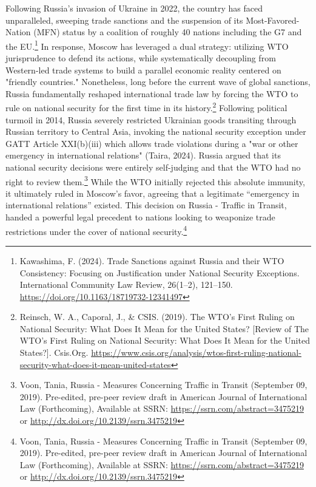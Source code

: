 Following Russia’s invasion of Ukraine in 2022, the country has faced unparalleled, sweeping trade sanctions and the suspension of its Most-Favored-Nation (MFN) status by a coalition of roughly 40 nations including the G7 and the EU.\footnote{Kawashima, F. (2024). Trade Sanctions against Russia and their WTO Consistency: Focusing on Justification under National Security Exceptions. International Community Law Review, 26(1–2), 121–150. \url{https://doi.org/10.1163/18719732-12341497}} In response, Moscow has leveraged a dual strategy: utilizing WTO jurisprudence to defend its actions, while systematically decoupling from Western-led trade systems to build a parallel economic reality centered on "friendly countries." Nonetheless, long before the current wave of global sanctions, Russia fundamentally reshaped international trade law by forcing the WTO to rule on national security for the first time in its history.\footnote{Reinsch, W. A., Caporal, J., \& CSIS. (2019). The WTO’s First Ruling on National Security: What Does It Mean for the United States? [Review of The WTO’s First Ruling on National Security: What Does It Mean for the United States?]. Csis.Org. \url{https://www.csis.org/analysis/wtos-first-ruling-national-security-what-does-it-mean-united-states}} Following political turmoil in 2014, Russia severely restricted Ukrainian goods transiting through Russian territory to Central Asia, invoking the national security exception under GATT Article XXI(b)(iii) which allows trade violations during a "war or other emergency in international relations" (Taira, 2024). Russia argued that its national security decisions were entirely self-judging and that the WTO had no right to review them.\footnote{Voon, Tania, Russia - Measures Concerning Traffic in Transit (September 09, 2019). Pre-edited, pre-peer review draft in American Journal of International Law (Forthcoming), Available at SSRN: \url{https://ssrn.com/abstract=3475219} or \url{http://dx.doi.org/10.2139/ssrn.3475219}} While the WTO initially rejected this absolute immunity, it ultimately ruled in Moscow’s favor, agreeing that a legitimate “emergency in international relations” existed. This decision on Russia - Traffic in Transit, handed a powerful legal precedent to nations looking to weaponize trade restrictions under the cover of national security.\footnote{Voon, Tania, Russia - Measures Concerning Traffic in Transit (September 09, 2019). Pre-edited, pre-peer review draft in American Journal of International Law (Forthcoming), Available at SSRN: \url{https://ssrn.com/abstract=3475219} or \url{http://dx.doi.org/10.2139/ssrn.3475219}}

